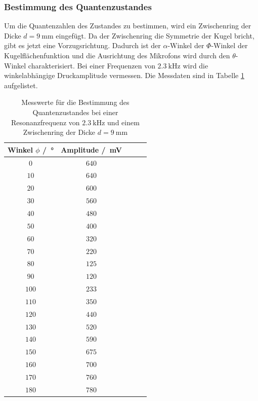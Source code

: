 \subsubsection{Bestimmung des Quantenzustandes}
Um die Quantenzahlen des Zustandes zu bestimmen, wird ein Zwischenring der Dicke $d=\SI{9}{\milli\meter}$ eingefügt.
Da der Zwischenring die Symmetrie der Kugel bricht, gibt es jetzt eine Vorzugsrichtung. Dadurch ist der $\alpha$-Winkel der $\Phi$-Winkel 
der Kugelflächenfunktion und die Ausrichtung des Mikrofons wird durch den $\theta$-Winkel charakterisiert.
Bei einer Frequenzen von $\SI{2.3}{\kilo\hertz}$ wird die winkelabhängige Druckamplitude vermessen. Die Messdaten sind in Tabelle
\ref{tab:Messdaten_9mmZwischenring} aufgelistet.
\FloatBarrier
\begin{table}
    \centering
    \caption{Messwerte für die Bestimmung des Quantenzustandes bei einer Resonanzfrequenz von $\SI{2.3}{\kilo\hertz}$ und einem Zwischenring der Dicke $d=\SI{9}{\milli\meter}$}
    \label{tab:Messdaten_9mmZwischenring}
    \begin{tabular}{c c c c c}
        \toprule
        Winkel $\phi$ /\SI{}{\degree}&Amplitude  /\SI{}{\milli\volt}\\
        \midrule
        $\num{0}$  &$\num{640}$ \\
        $\num{10}$ &$\num{640}$ \\
        $\num{20}$ &$\num{600}$ \\
        $\num{30}$ &$\num{560}$ \\
        $\num{40}$ &$\num{480}$ \\
        $\num{50}$ &$\num{400}$\\
        $\num{60}$ &$\num{320}$\\
        $\num{70}$ &$\num{220}$\\
        $\num{80}$ &$\num{125}$\\
        $\num{90}$ &$\num{120}$\\
        $\num{100}$&$\num{233}$\\
        $\num{110}$&$\num{350}$\\
        $\num{120}$&$\num{440}$\\
        $\num{130}$&$\num{520}$\\
        $\num{140}$&$\num{590}$\\
        $\num{150}$&$\num{675}$\\
        $\num{160}$&$\num{700}$\\
        $\num{170}$&$\num{760}$\\
        $\num{180}$&$\num{780}$\\
        \bottomrule
    \end{tabular}
\end{table}

